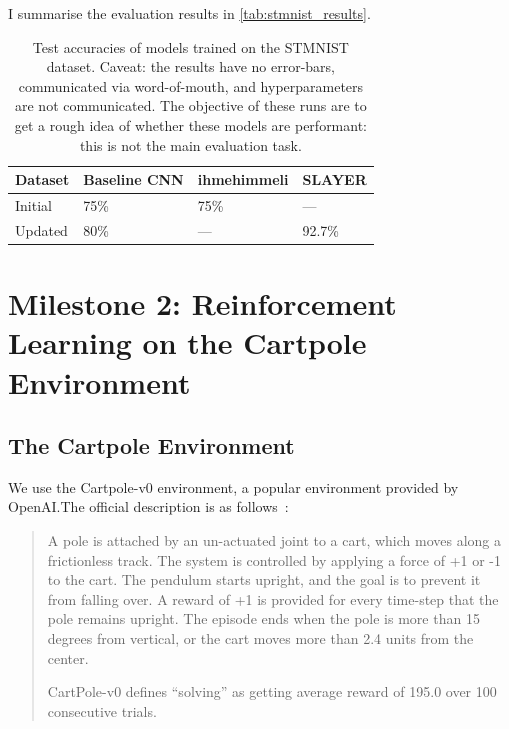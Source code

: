 \documentclass[fyp]{socreport}
\begin{document}
I summarise the evaluation results in \autoref{tab:stmnist_results}.

\begin{table}[htbp]
\caption{\label{tab:stmnist_results} Test accuracies of models trained on the
STMNIST dataset. Caveat: the results have no error-bars, communicated via
word-of-mouth, and hyperparameters are not communicated. The objective of these
runs are to get a rough idea of whether these models are performant: this is not
the main evaluation task.}  \centering
\begin{tabular}{llll}
  \toprule
  Dataset & Baseline CNN & ihmehimmeli & SLAYER \\
  \midrule Initial & 75\% & 75\% & --- \\
  Updated & 80\% & --- & 92.7\%\\
  \bottomrule
\end{tabular}
\end{table}


\section{Milestone 2: Reinforcement Learning on the Cartpole Environment}

\subsection{The Cartpole Environment}


We use the Cartpole-v0 environment, a popular environment provided by
OpenAI.\@ The official description is as follows~\cite{openai_gym}:

\begin{quote} A pole is attached by an un-actuated joint to a cart, which moves
along a frictionless track. The system is controlled by applying a force of +1
or -1 to the cart. The pendulum starts upright, and the goal is to prevent it
from falling over. A reward of +1 is provided for every time-step that the pole
remains upright. The episode ends when the pole is more than 15 degrees from
vertical, or the cart moves more than 2.4 units from the center.

CartPole-v0 defines ``solving'' as getting average reward of 195.0 over 100
consecutive trials.
\end{quote}
\end{document}
